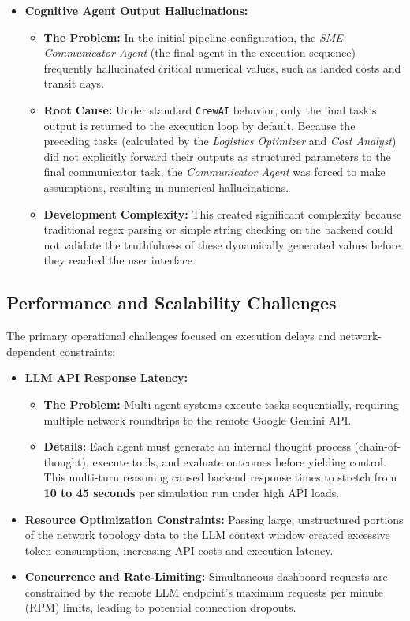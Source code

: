\begin{itemize}
    \item \textbf{Cognitive Agent Output Hallucinations:}
    \begin{itemize}
        \item \textbf{The Problem:} In the initial pipeline configuration, the \textit{SME Communicator Agent} (the final agent in the execution sequence) frequently hallucinated critical numerical values, such as landed costs and transit days.
        \item \textbf{Root Cause:} Under standard \texttt{CrewAI} behavior, only the final task's output is returned to the execution loop by default. Because the preceding tasks (calculated by the \textit{Logistics Optimizer} and \textit{Cost Analyst}) did not explicitly forward their outputs as structured parameters to the final communicator task, the \textit{Communicator Agent} was forced to make assumptions, resulting in numerical hallucinations.
        \item \textbf{Development Complexity:} This created significant complexity because traditional regex parsing or simple string checking on the backend could not validate the truthfulness of these dynamically generated values before they reached the user interface.
    \end{itemize}
\end{itemize}

\subsection[Performance and Scalability Challenges]{Performance and Scalability Challenges}
The primary operational challenges focused on execution delays and network-dependent constraints:

\begin{itemize}
    \item \textbf{LLM API Response Latency:}
    \begin{itemize}
        \item \textbf{The Problem:} Multi-agent systems execute tasks sequentially, requiring multiple network roundtrips to the remote Google Gemini API. 
        \item \textbf{Details:} Each agent must generate an internal thought process (chain-of-thought), execute tools, and evaluate outcomes before yielding control. This multi-turn reasoning caused backend response times to stretch from \textbf{10 to 45 seconds} per simulation run under high API loads.
    \end{itemize}
    \item \textbf{Resource Optimization Constraints:} Passing large, unstructured portions of the network topology data to the LLM context window created excessive token consumption, increasing API costs and execution latency.
    \item \textbf{Concurrence and Rate-Limiting:} Simultaneous dashboard requests are constrained by the remote LLM endpoint's maximum requests per minute (RPM) limits, leading to potential connection dropouts.
\end{itemize}

